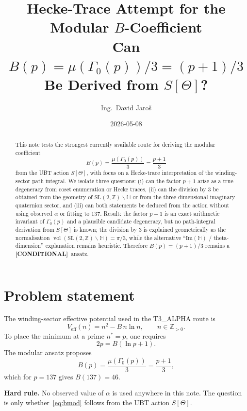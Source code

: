 \documentclass[12pt,a4paper]{article}
\title{\textbf{Hecke-Trace Attempt for the Modular $B$-Coefficient}\\[3pt]
\large Can $B(p)=\mu(\Gamma_0(p))/3=(p+1)/3$ Be Derived from $S[\Theta]$?}
\author{Ing.\ David Jaro\v{s}}
\date{2026-05-08}
\theoremstyle{remark}
\newcommand{\COND}{\textcolor{blue!70!black}{\textbf{[CONDITIONAL]}}}
\begin{document}
\maketitle

\begin{abstract}
This note tests the strongest currently available route for deriving the modular
coefficient
\[
  B(p)=\frac{\mu(\Gamma_0(p))}{3}=\frac{p+1}{3}
\]
from the UBT action $S[\Theta]$, with focus on a Hecke-trace interpretation of
the winding-sector path integral.  We isolate three questions: (i) can the
factor $p+1$ arise as a true degeneracy from coset enumeration or Hecke traces,
(ii) can the division by $3$ be obtained from the geometry of
$\mathrm{SL}(2,\mathbb{Z})\backslash\mathbb{H}$ or from the three-dimensional
imaginary quaternion sector, and (iii) can both statements be deduced from the
action without using observed $\alpha$ or fitting to $137$.  Result: the factor
$p+1$ is an exact arithmetic invariant of $\Gamma_0(p)$ and a plausible
candidate degeneracy, but no path-integral derivation from $S[\Theta]$ is known;
the division by $3$ is explained geometrically as the normalisation
$\operatorname{vol}(\mathrm{SL}(2,\mathbb{Z})\backslash\mathbb{H})=\pi/3$, while
the alternative ``$\mathrm{Im}(\mathbb{H})$ / theta-dimension'' explanation
remains heuristic.  Therefore $B(p)=(p+1)/3$ remains a \COND\ ansatz.
\end{abstract}

\tableofcontents
\newpage

\section{Problem statement}

The winding-sector effective potential used in the T3\_ALPHA route is
\begin{equation}
  V_{\mathrm{eff}}(n)=n^2-B\,n\ln n,
  \qquad n\in \mathbb{Z}_{>0}.
  \label{eq:veff}
\end{equation}
To place the minimum at a prime $n^*=p$, one requires
\begin{equation}
  2p = B(\ln p + 1).
  \label{eq:stationary}
\end{equation}
The modular ansatz proposes
\begin{equation}
  B(p)=\frac{\mu(\Gamma_0(p))}{3}=\frac{p+1}{3},
  \label{eq:bmod}
\end{equation}
which for $p=137$ gives $B(137)=46$.

\begin{warnbox}
\textbf{Hard rule.}  No observed value of $\alpha$ is used anywhere in this
note.  The question is only whether~\eqref{eq:bmod} follows from the UBT action
$S[\Theta]$.
\end{warnbox}
\end{document}
